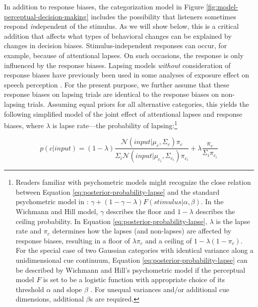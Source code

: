 \documentclass[
  11pt,
  man,floatsintext]{apa6}
\begin{document}
In addition to response biases, the categorization model in Figure \ref{fig:model-perceptual-decision-making} includes the possibility that listeners sometimes respond \emph{in}dependent of the stimulus. As we will show below, this is a critical addition that affects what types of behavioral changes can be explained by changes in decision biases. Stimulus-independent responses can occur, for example, because of attentional lapses. On such occasions, the response is only influenced by the response biases. Lapsing models \emph{without} consideration of response biases have previously been used in some analyses of exposure effect on speech perception \autocite{clayards2008,mcmurray-jongman2011,kleinschmidt-jaeger2016cogsci}. For the present purpose, we further assume that these response biases on lapsing trials are identical to the response biases on non-lapsing trials. Assuming equal priors for all alternative categories, this yields the following simplified model of the joint effect of attentional lapses and response biases, where \(\lambda\) is lapse rate---the probability of lapsing:\footnote{Readers familiar with psychometric models might recognize the close relation between Equation \eqref{eq:posterior-probability-lapse} and the standard psychometric model in \textcite{wichmann-hill2001}: \(\gamma + (1-\gamma-\lambda) F(stimulus | \alpha, \beta)\). In the Wichmann and Hill model, \(\gamma\) describes the floor and \(1-\lambda\) describes the ceiling probability. In Equation \eqref{eq:posterior-probability-lapse}, \(\lambda\) is the lapse rate and \(\pi_c\) determines how the lapses (and non-lapses) are affected by response biases, resulting in a floor of \(\lambda \pi_c\) and a ceiling of \(1 - \lambda(1 - \pi_c)\). For the special case of two Gaussian categories with identical variance along a unidimensional cue continuum, Equation \eqref{eq:posterior-probability-lapse} can be described by Wichmann and Hill's psychometric model if the perceptual model \(F\) is set to be a logistic function with appropriate choice of its threshold \(\alpha\) and slope \(\beta\) \autocite[cf.][p.~200]{kleinschmidt-jaeger2015}. For unequal variances and/or additional cue dimensions, additional \(\beta\)s are required.}

\begin{equation}\label{eq:posterior-probability-lapse}
p(c | input) = (1 - \lambda) \frac{\mathcal{N}\!\left( input | \mu_c, \Sigma_c \right) \pi_c}{\Sigma_i \mathcal{N}\!\left( input | \mu_{c_i}, \Sigma_{c_i} \right) \pi_{c_i}} + \lambda \frac{\pi_c}{\Sigma_i \pi_{c_i}}
\end{equation}
\end{document}
